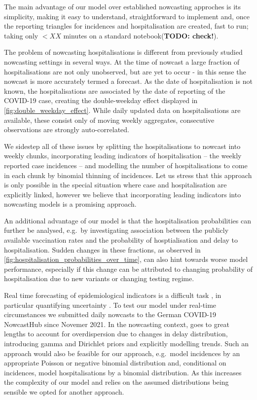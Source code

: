 The main advantage of our model over established nowcasting approches is
its simplicity, making it easy to understand, straightforward to
implement and, once the reporting triangles for incidences and
hospitalisation are created, fast to run; taking only \(< XX\) minutes
on a standard notebook(\textbf{TODO: check!}).

The problem of nowcasting hospitalisations is different from previously
studied nowcasting settings in several ways. At the time of nowcast a
large fraction of hospitalisations are not only unobserved, but are yet
to occur - in this sense the nowcast is more accurately termed a
forecast. As the date of hospitalisation is not known, the
hospitalisations are associated by the date of reporting of the COVID-19
case, creating the double-weekday effect displayed in
\cref{fig:double_weekday_effect}. While daily updated data on
hospitalisations are available, these consist only of moving weekly
aggregates, consecutive observations are strongly auto-correlated.

We sidestep all of these issues by splitting the hospitalisations to
nowcast into weekly chunks, incorporating leading indicators of
hospitalisation -- the weekly reported case incidences -- and modelling
the number of hospitalisations to come in each chunk by binomial
thinning of incidences. Let us stress that this approach is only
possible in the special situation where case and hospitalisation are
explicitly linked, however we believe that incorporating leading
indicators into nowcasting models is a promising approach.

An additional advantage of our model is that the hospitalisation
probabilities can further be analysed, e.g.~by investigating association
between the publicly available vaccination rates and the probability of
hosptialisation and delay to hospitalisation. Sudden changes in these
fractions, as observed in 
\cref{fig:hospitalisation_probabilities_over_time}, can also hint towards
worse model performance, especially if this change can be attributed to
changing probability of hospitalisation due to new variants or changing
testing regime.

Real time forecasting of epidemiological indicators is a difficult task
\cite{Desai2019Realtime}, in particular quantifying uncertainty
\cite{Bracher2021Preregistered}. To test our model under real-time
circumstances we submitted daily nowcasts to the German COVID-19
NowcastHub \cite{2022Nowcasts} since Novemer 2021. In the nowcasting
context, \cite{Lawless1994Adjustments} goes to great lengths to
account for overdispersion due to changes in delay distribution,
introducing gamma and Dirichlet priors and explicitly modelling trends.
Such an approach would also be feasible for our approach, e.g.~model
incidences by an appropriate Poisson or negative binomial distribution
and, conditional on incidences, model hospitalisations by a binomial
distribution. As this increases the complexity of our model and relies
on the assumed distributions being sensible we opted for another
approach.

